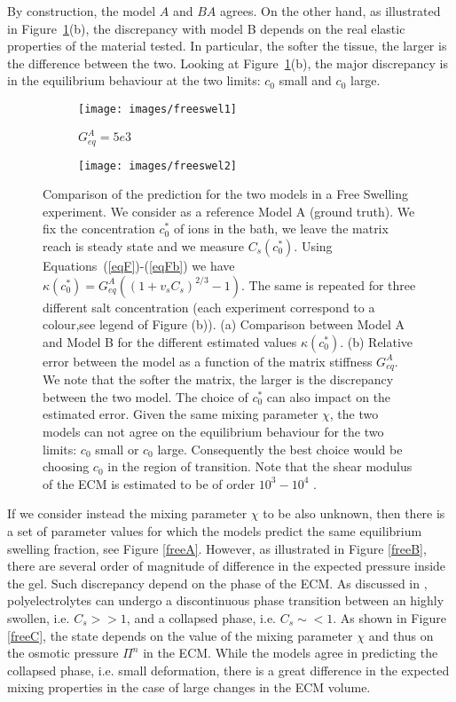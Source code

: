 By construction, the model $A$ and $BA$ agrees. On the other hand, as illustrated in Figure~\ref{Exp1}(b), the discrepancy with model B depends on the real elastic properties of the material tested. In particular, the softer the tissue, the larger is the difference between the two. Looking at Figure~\ref{Exp1}(b), the major discrepancy is in the equilibrium behaviour at the two limits: $c_0$ small and $c_0$ large. 

\begin{figure}[h]
	\begin{subfigure}{0.6\textwidth}
		\texttt{[image: images/freeswel1]}
		\caption{$G^A_{eq}=5e3$}
	\end{subfigure}
	\begin{subfigure}{0.39\textwidth}
		\hspace{-8mm}
		\texttt{[image: images/freeswel2]}
		\caption{}
	\end{subfigure}
	\vspace{3mm}
	\caption{Comparison of the prediction for the two models in a Free Swelling experiment. We consider as a reference Model A (ground truth). We fix the concentration $c^*_0$ of ions in the bath, we leave the matrix reach is steady state and we measure $C_s(c^*_0)$. Using Equations~(\ref{eqF})-(\ref{eqFb}) we have $\kappa(c^*_0)=G^A_{eq}((1+v_sC_s)^{2/3}-1)$. The same is repeated for three different salt concentration (each experiment correspond to a colour,see legend of Figure (b)). (a) 
		Comparison between Model A and Model B for the different estimated values $\kappa(c^*_0)$. (b) Relative error between the model as a function of the matrix stiffness $G_{eq}^A$. We note that the softer the matrix, the larger is the discrepancy between the two model. The choice of $c^*_0$ can also impact on the estimated error. Given the same mixing parameter $\chi$, the two models can not agree on the equilibrium behaviour for the two limits: $c_0$ small or $c_0$ large. Consequently the best choice would be choosing $c_0$ in the region of transition. Note that the shear modulus of the ECM is estimated to be of order $10^3-10^4$ \cite{Netti}.}
	\label{Exp1}
\end{figure}

If we consider instead the mixing parameter $\chi$ to be also unknown, then there is a set of parameter values for which the models predict the same equilibrium swelling fraction, see Figure \ref{freeA}. However, as illustrated in Figure \ref{freeB}, there are several order of magnitude of difference in the expected pressure inside the gel. Such discrepancy depend on the phase of the ECM. As discussed in \cite{}, polyelectrolytes can undergo a discontinuous phase transition between an highly swollen, i.e. $C_s>>1$, and a collapsed phase, i.e. $C_s\sim<1$. As shown in Figure \ref{freeC}, the state depends on the value of the mixing parameter $\chi$ and thus on the osmotic pressure $\Pi^n$ in the ECM. While the models agree in predicting the collapsed phase, i.e. small deformation, there is a great difference in the expected mixing properties in the case of large changes in the ECM volume. 

